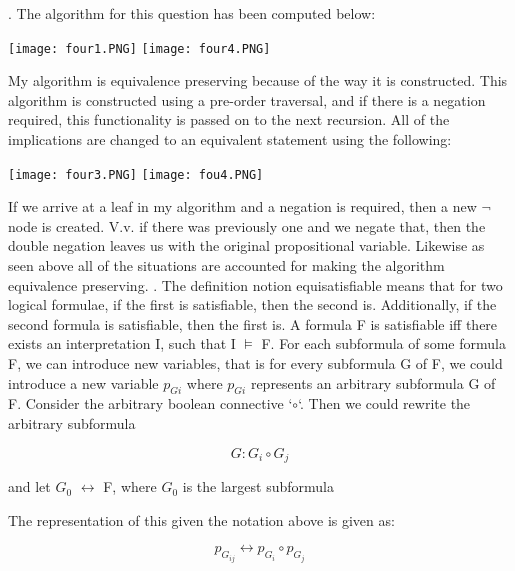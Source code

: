 \documentclass[11pt]{article}
\begin{document}
\begin{enumerate}
.
\newline
The algorithm for this question has been computed below:

\texttt{[image: four1.PNG]}
\texttt{[image: four4.PNG]} 
\newline 

My algorithm is equivalence preserving because of the way it is constructed. This algorithm is constructed using a pre-order traversal, and if there is a negation required, this functionality is passed on to the next recursion. All of the implications are changed to an equivalent statement using the following:

\texttt{[image: four3.PNG]}
\texttt{[image: fou4.PNG]} 

If we arrive at a leaf in my algorithm and a negation is required, then a new $\neg$ node is created. V.v. if there was previously one and we negate that, then the double negation leaves us with the original propositional variable. Likewise as seen above all of the situations are accounted for making the algorithm equivalence preserving.
.
\newline
The definition notion equisatisfiable means that for two logical formulae, if the first is satisfiable, then the second is. Additionally, if the second formula is satisfiable, then the first is.
A formula F is satisfiable iff there exists an interpretation I, such that I $\vDash$ F. 
\newline 
\newline 
For each subformula of some formula F, we can introduce new variables, that is for every subformula G of F, we could introduce a new variable $p_{Gi}$ where $p_{Gi}$ represents an arbitrary subformula G of F. Consider the arbitrary boolean connective `$\circ$`.  Then we could rewrite the arbitrary subformula 

\begin{equation}
    G : G_i \circ G_j  
\end{equation}

and let $G_0$ $\leftrightarrow$ F, where $G_0$ is the largest subformula

The representation of this given the notation above is given as: 

\begin{equation}
    p_{G_{ij}} \leftrightarrow p_{G_{i}} \circ p_{G_{j}}
\end{equation}


\end{enumerate}
\end{document}
